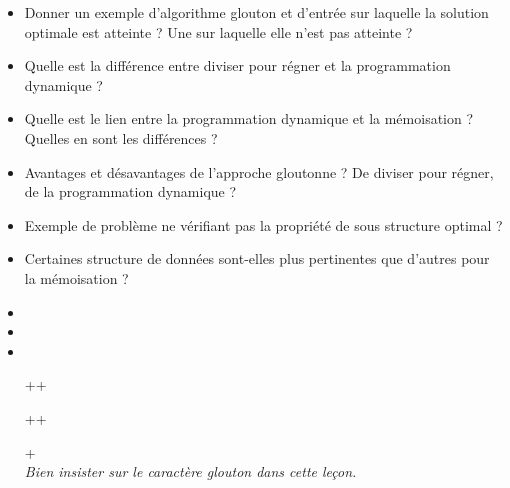 \documentclass{agregfiche}
\begin{document}
\secquestionsclassiques

\begin{itemize}
    \item Donner un exemple d'algorithme glouton et d'entrée sur
    laquelle la solution optimale est atteinte ? Une sur laquelle
    elle n'est pas atteinte ?
    \item Quelle est la différence entre diviser pour régner et la programmation dynamique ?
    \item Quelle est le lien entre la programmation dynamique et la mémoisation ? Quelles en sont les différences ?
    \item Avantages et désavantages de l'approche gloutonne ? De diviser pour régner, de la programmation dynamique ?
    \item Exemple de problème ne vérifiant pas la propriété de sous
    structure optimal ?
    \item Certaines structure de données sont-elles plus pertinentes
    que d'autres pour la mémoisation ?
\end{itemize}

\secreferences

\begin{itemize}
    \item 
    \item 
    \item 
\end{itemize}

\secdev

\begin{itemize}
    \item[++] 
    \item[++] 
    \item[+] 
      \textit{\\Bien insister sur le caractère glouton dans cette
      leçon.}
\end{itemize}
\end{document}
